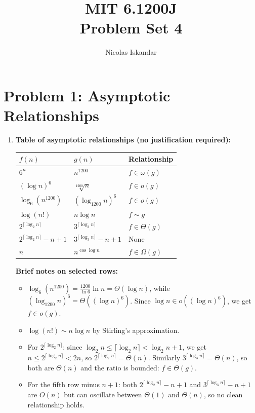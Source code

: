 \documentclass[11pt]{article}
\title{
    \vspace{-2em}
    MIT 6.1200J \\
    Problem Set 4
}
\author{Nicolas Iskandar}
\date{}
\begin{document}
\maketitle

\section*{Problem 1: Asymptotic Relationships}
\begin{enumerate}[label=\textbf{(\alph*)}]

\item \textbf{Table of asymptotic relationships (no justification required):}

\begin{center}
\renewcommand{\arraystretch}{1.4}
\begin{tabular}{|l|l|l|}
\hline
$f(n)$ & $g(n)$ & Relationship \\
\hline
$6^n$ & $n^{1200}$ & $f \in \omega(g)$ \\
$(\log n)^6$ & $\sqrt[1200]{n}$ & $f \in o(g)$ \\
$\log_6(n^{1200})$ & $(\log_{1200} n)^6$ & $f \in o(g)$ \\
$\log(n!)$ & $n \log n$ & $f \sim g$ \\
$2^{\lceil \log_2 n \rceil}$ & $3^{\lceil \log_3 n \rceil}$ & $f \in \Theta(g)$ \\
$2^{\lceil \log_2 n \rceil} - n + 1$ & $3^{\lceil \log_3 n \rceil} - n + 1$ & None \\
$n$ & $n^{\cos \log n}$ & $f \in \Omega(g)$ \\
\hline
\end{tabular}
\end{center}

\textbf{Brief notes on selected rows:}
\begin{itemize}
  \item $\log_6(n^{1200}) = \frac{1200}{\ln 6}\ln n = \Theta(\log n)$, while $(\log_{1200} n)^6 = \Theta((\log n)^6)$. Since $\log n \in o((\log n)^6)$, we get $f \in o(g)$.
  \item $\log(n!) \sim n\log n$ by Stirling's approximation.
  \item For $2^{\lceil\log_2 n\rceil}$: since $\log_2 n \le \lceil\log_2 n\rceil < \log_2 n + 1$, we get $n \le 2^{\lceil\log_2 n\rceil} < 2n$, so $2^{\lceil\log_2 n\rceil} = \Theta(n)$. Similarly $3^{\lceil\log_3 n\rceil} = \Theta(n)$, so both are $\Theta(n)$ and the ratio is bounded: $f \in \Theta(g)$.
  \item For the fifth row minus $n+1$: both $2^{\lceil\log_2 n\rceil} - n + 1$ and $3^{\lceil\log_3 n\rceil} - n + 1$ are $O(n)$ but can oscillate between $\Theta(1)$ and $\Theta(n)$, so no clean relationship holds.
\end{itemize}


\end{enumerate}
\end{document}
